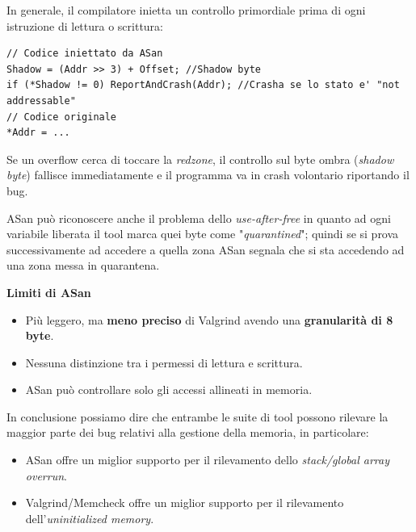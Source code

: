 In generale, il compilatore inietta un controllo primordiale prima di ogni 
istruzione di lettura o scrittura:

\begin{lstlisting}
// Codice iniettato da ASan
Shadow = (Addr >> 3) + Offset; //Shadow byte
if (*Shadow != 0) ReportAndCrash(Addr); //Crasha se lo stato e' "not addressable"
// Codice originale
*Addr = ...
\end{lstlisting}

Se un overflow cerca di toccare la \textit{redzone}, il controllo sul byte 
ombra (\textit{shadow byte}) fallisce immediatamente e il programma va in crash volontario 
riportando il bug.

ASan può riconoscere anche il problema dello \textit{use-after-free} in quanto
ad ogni variabile liberata il tool marca quei byte come "\textit{quarantined}"; quindi
se si prova successivamente ad accedere a quella zona ASan segnala che si sta
accedendo ad una zona messa in quarantena.

\textbf{Limiti di ASan}
\begin{itemize}
    \item Più leggero, ma \textbf{meno preciso} di Valgrind avendo una \textbf{granularità di 8 byte}.
    \item Nessuna distinzione tra i permessi di lettura e scrittura.
    \item ASan può controllare solo gli accessi allineati in memoria.
\end{itemize}

In conclusione possiamo dire che entrambe le suite di tool possono rilevare
la maggior parte dei bug relativi alla gestione della memoria, in particolare:

\begin{itemize}
    \item ASan offre un miglior supporto per il rilevamento dello \textit{stack/global array overrun}.
    \item Valgrind/Memcheck offre un miglior supporto per il rilevamento dell'\textit{uninitialized memory}.
\end{itemize}